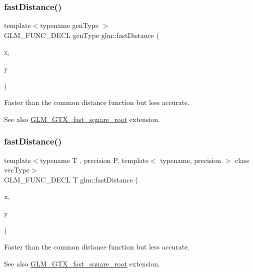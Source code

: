 \subsubsection{\texorpdfstring{fast\+Distance()}{fastDistance()}\hspace{0.1cm}{\footnotesize\ttfamily [1/2]}}
{\footnotesize\ttfamily template$<$typename gen\+Type $>$ \\
G\+L\+M\+\_\+\+F\+U\+N\+C\+\_\+\+D\+E\+CL gen\+Type glm\+::fast\+Distance (\begin{DoxyParamCaption}\item[{gen\+Type}]{x,  }\item[{gen\+Type}]{y }\end{DoxyParamCaption})}

Faster than the common distance function but less accurate.

\begin{DoxySeeAlso}{See also}
\hyperlink{group__gtx__fast__square__root}{G\+L\+M\+\_\+\+G\+T\+X\+\_\+fast\+\_\+square\+\_\+root} extension. 
\end{DoxySeeAlso}
\mbox{\label{group__gtx__fast__square__root_ga6d1ac559cd77d69119e30c3aca0e14b5}} 
\subsubsection{\texorpdfstring{fast\+Distance()}{fastDistance()}\hspace{0.1cm}{\footnotesize\ttfamily [2/2]}}
{\footnotesize\ttfamily template$<$typename T , precision P, template$<$ typename, precision $>$ class vec\+Type$>$ \\
G\+L\+M\+\_\+\+F\+U\+N\+C\+\_\+\+D\+E\+CL T glm\+::fast\+Distance (\begin{DoxyParamCaption}\item[{vec\+Type$<$ T, P $>$ const \&}]{x,  }\item[{vec\+Type$<$ T, P $>$ const \&}]{y }\end{DoxyParamCaption})}

Faster than the common distance function but less accurate.

\begin{DoxySeeAlso}{See also}
\hyperlink{group__gtx__fast__square__root}{G\+L\+M\+\_\+\+G\+T\+X\+\_\+fast\+\_\+square\+\_\+root} extension. 
\end{DoxySeeAlso}
\mbox{\label{group__gtx__fast__square__root_ga7f081b14d9c7035c8714eba5f7f75a8f}} 
